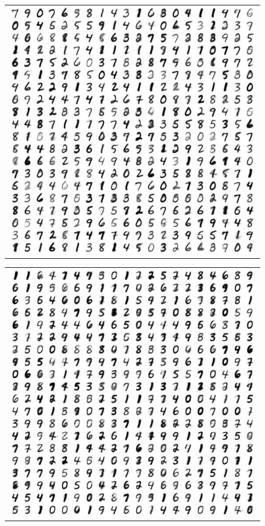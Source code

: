 \documentclass[letterpaper, twoside]{article}
\begin{document}
\begin{figure}[h]
\centering
\begin{minipage}{.33\textwidth}
\begin{tabular}{|@{}c@{}|}
\includegraphics[scale=0.5]{manifold_28.jpg}\\
\end{tabular}
\end{minipage}%
\begin{minipage}{.33\textwidth}
\begin{tabular}{|@{}c@{}|}
\includegraphics[scale=0.5]{manifold_39.jpg}\\

\end{tabular}
\end{minipage}
\end{figure}
\end{document}
